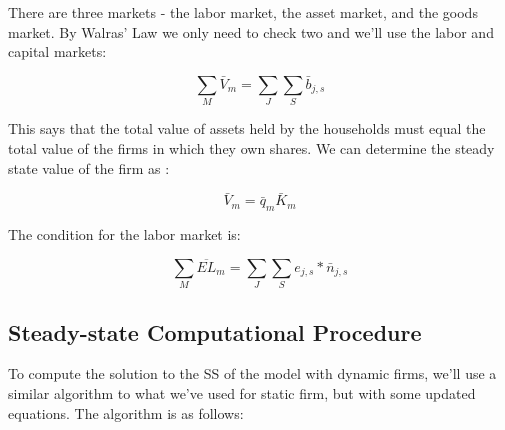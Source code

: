 \documentclass[letterpaper,12pt]{article}
\theoremstyle{definition}
\begin{document}
\begin{spacing}{1.5}
There are three markets - the labor market, the asset market, and the goods market.  By Walras' Law we only need to check two and we'll use the labor and capital markets:

\begin{equation}
\sum_{M} \bar{V}_{m} = \sum_{J}\sum_{S}\bar{b}_{j,s}
\end{equation}

\noindent\noindent This says that the total value of assets held by the households must equal the total value of the firms in which they own shares. We can determine the steady state value of the firm as :

\begin{equation}
\label{eqn:solve_firm_value_tax_ss}
\bar{V}_{m} =\bar{q}_{m}\bar{K}_{m}
\end{equation}

The condition for the labor market is: 

\begin{equation}
\sum_{M} \overline{EL}_{m} = \sum_{J}\sum_{S}e_{j,s}*\bar{n}_{j,s}
\end{equation}

\subsection*{Steady-state Computational Procedure}

To compute the solution to the SS of the model with dynamic firms, we'll use a similar algorithm to what we've used for static firm, but with some updated equations.  The algorithm is as follows:


\end{spacing}
\end{document}
